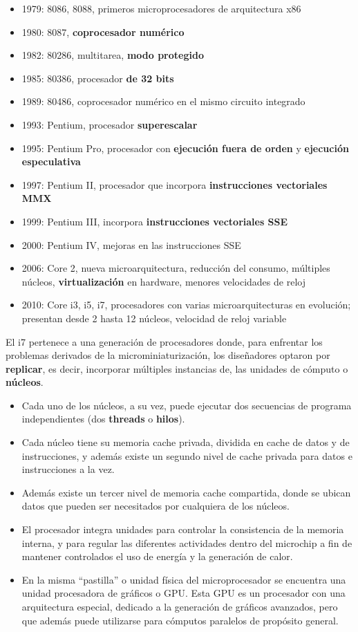 \documentclass[spanish,a4paper,]{article}
\providecommand{\tightlist}{%
  \setlength{\itemsep}{0pt}\setlength{\parskip}{0pt}}
\begin{document}
\begin{itemize}
\tightlist
\item
  1979: 8086, 8088, primeros microprocesadores de arquitectura x86
\item
  1980: 8087, \textbf{coprocesador numérico}
\item
  1982: 80286, multitarea, \textbf{modo protegido}
\item
  1985: 80386, procesador \textbf{de 32 bits}
\item
  1989: 80486, coprocesador numérico en el mismo circuito integrado
\item
  1993: Pentium, procesador \textbf{superescalar}
\item
  1995: Pentium Pro, procesador con \textbf{ejecución fuera de orden} y
  \textbf{ejecución especulativa}
\item
  1997: Pentium II, procesador que incorpora \textbf{instrucciones
  vectoriales MMX}
\item
  1999: Pentium III, incorpora \textbf{instrucciones vectoriales SSE}
\item
  2000: Pentium IV, mejoras en las instrucciones SSE
\item
  2006: Core 2, nueva microarquitectura, reducción del consumo,
  múltiples núcleos, \textbf{virtualización} en hardware, menores
  velocidades de reloj
\item
  2010: Core i3, i5, i7, procesadores con varias microarquitecturas en
  evolución; presentan desde 2 hasta 12 núcleos, velocidad de reloj
  variable
\end{itemize}

El i7 pertenece a una generación de procesadores donde, para enfrentar
los problemas derivados de la microminiaturización, los diseñadores
optaron por \textbf{replicar}, es decir, incorporar múltiples instancias
de, las unidades de cómputo o \textbf{núcleos}.

\begin{itemize}
\item
  Cada uno de los núcleos, a su vez, puede ejecutar dos secuencias de
  programa independientes (dos \textbf{threads} o \textbf{hilos}).
\item
  Cada núcleo tiene su memoria cache privada, dividida en cache de datos
  y de instrucciones, y además existe un segundo nivel de cache privada
  para datos e instrucciones a la vez.
\item
  Además existe un tercer nivel de memoria cache compartida, donde se
  ubican datos que pueden ser necesitados por cualquiera de los núcleos.
\item
  El procesador integra unidades para controlar la consistencia de la
  memoria interna, y para regular las diferentes actividades dentro del
  microchip a fin de mantener controlados el uso de energía y la
  generación de calor.
\item
  En la misma ``pastilla'' o unidad física del microprocesador se
  encuentra una unidad procesadora de gráficos o GPU. Esta GPU es un
  procesador con una arquitectura especial, dedicado a la generación de
  gráficos avanzados, pero que además puede utilizarse para cómputos
  paralelos de propósito general.
\end{itemize}
\end{document}
